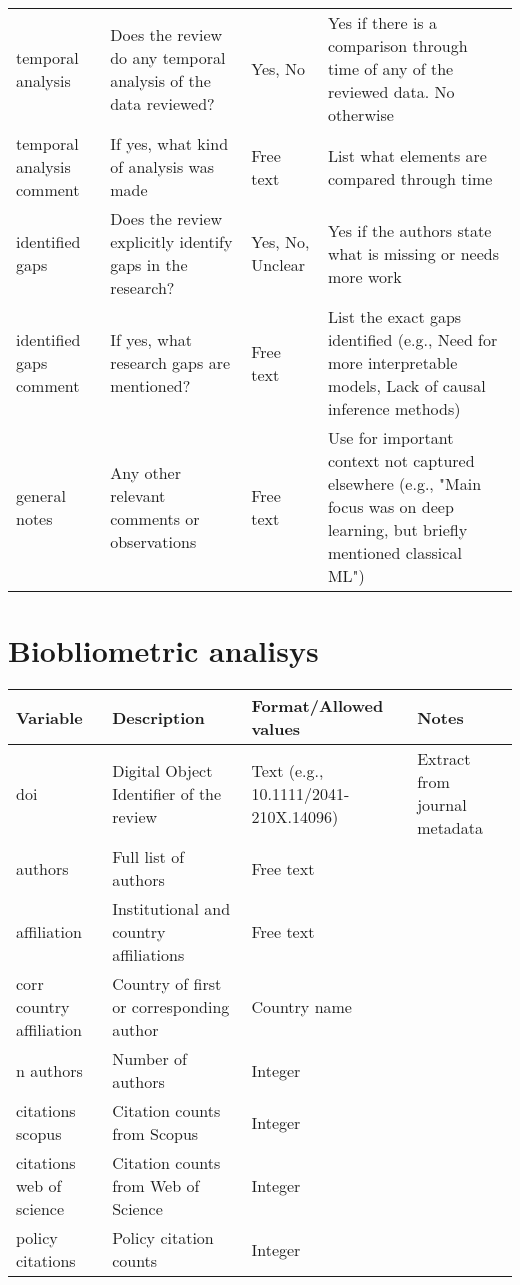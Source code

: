 \documentclass{article}
\begin{document}
\begin{longtable}{p{1.5cm}p{3cm}p{3cm}p{3cm}}
        temporal analysis & Does the review do any temporal analysis of the data reviewed? & Yes, No & Yes if there is a comparison through time of any of the reviewed data. No otherwise\\
        temporal analysis comment & If yes, what kind of analysis was made & Free text & List what elements are compared through time\\
        identified gaps & Does the review explicitly identify gaps in the research? & Yes, No, Unclear & Yes if the authors state what is missing or needs more work\\
        identified gaps comment & If yes, what research gaps are mentioned? & Free text & List the exact gaps identified (e.g., Need for more interpretable models, Lack of causal inference methods)\\
        general notes & Any other relevant comments or observations & Free text & Use for important context not captured elsewhere (e.g., "Main focus was on deep learning, but briefly mentioned classical ML")\\
         \hline
    \end{longtable}

\section{Biobliometric analisys}
\begin{longtable}{p{1.5cm}p{3cm}p{3cm}p{3cm}}
        \hline
         \textbf{Variable} & \textbf{Description} & \textbf{Format/Allowed values} & \textbf{Notes}\\
         \hline
         doi & Digital Object Identifier of the review & Text (e.g., 10.1111/2041-210X.14096) & Extract from journal metadata\\
         authors & Full list of authors & Free text & \\
         affiliation & Institutional and country affiliations & Free text & \\
         corr country affiliation & Country of first or corresponding author & Country name & \\
         n authors & Number of authors & Integer & \\
         citations scopus & Citation counts from Scopus & Integer & \\
         citations web of science & Citation counts from Web of Science & Integer & \\
         policy citations & Policy citation counts & Integer & \\

\end{longtable}
\end{document}
